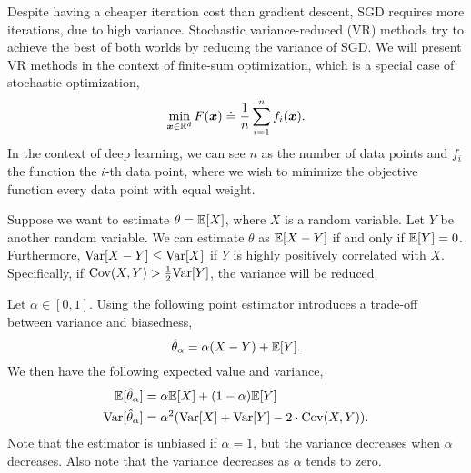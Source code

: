 Despite having a cheaper iteration cost than gradient descent, SGD requires more iterations,
due to high variance. Stochastic variance-reduced (VR) methods try to achieve the best of both
worlds by reducing the variance of SGD. We will
present VR methods in the context of finite-sum optimization, which is a special case of stochastic
optimization, \[
    \min_{\bm{x} \in \mathbb{R}^d} F(\bm{x}) \doteq \frac{1}{n} \sum_{i=1}^{n} f_i(\bm{x}).
\]
In the context of deep learning, we can see $n$ as the number of data points and $f_i$ the function
\wrt the $i$-th data point, where we wish to minimize the objective function \wrt every data point
with equal weight.

Suppose we want to estimate $\theta = \mathbb{E}[X]$, where $X$ is a random variable. Let $Y$ be another
random variable. We can estimate $\theta$ as $\mathbb{E}[X-Y]$ if and only if $\mathbb{E}[Y] = 0$. Furthermore,
$\mathrm{Var}[X - Y] \leq \mathrm{Var}[X]$ if $Y$ is highly positively correlated with $X$. Specifically, if
$\mathrm{Cov}(X, Y) > \frac{1}{2} \mathrm{Var}[Y]$, the variance will be reduced.

Let $\alpha \in [0,1]$. Using the following point estimator introduces a trade-off between variance
and biasedness, \[
    \hat{\theta}_{\alpha} = \alpha(X - Y) + \mathbb{E}[Y].
\]
We then have the following expected value and variance,
\begin{align*}
    \mathbb{E}[\hat{\theta}_{\alpha}]   & = \alpha \mathbb{E}[X] + (1 - \alpha) \mathbb{E}[Y]                         \\
    \mathrm{Var}[\hat{\theta}_{\alpha}] & = \alpha^2 (\mathrm{Var}[X] + \mathrm{Var}[Y] - 2\cdot \mathrm{Cov}(X, Y)).
\end{align*}
Note that the estimator is unbiased if $\alpha=1$, but the variance decreases when $\alpha$ decreases.
Also note that the variance decreases as $\alpha$ tends to zero.

